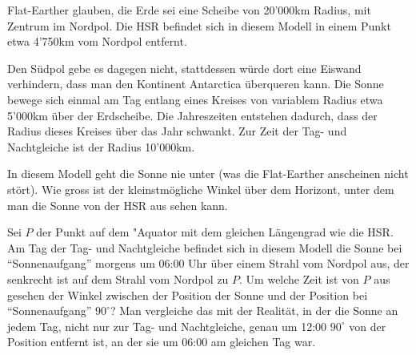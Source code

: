 Flat-Earther glauben, die Erde sei eine Scheibe von 20'000km Radius,
mit Zentrum im Nordpol.
Die HSR befindet sich in diesem Modell in einem Punkt etwa 4'750km
vom Nordpol entfernt.

Den Südpol gebe es dagegen nicht, stattdessen würde dort eine Eiswand
verhindern, dass man den Kontinent Antarctica überqueren kann.
Die Sonne bewege sich einmal am Tag entlang eines Kreises von variablem
Radius etwa 5'000km über der Erdscheibe.
Die Jahreszeiten entstehen dadurch, dass der Radius dieses Kreises
über das Jahr schwankt.
Zur Zeit der Tag- und Nachtgleiche ist der Radius 10'000km.

\begin{teilaufgaben}
\item
In diesem Modell geht die Sonne nie unter (was die Flat-Earther anscheinen
nicht stört).
Wie gross ist der kleinstmögliche Winkel über dem Horizont, unter dem
man die Sonne von der HSR aus sehen kann.
\item
Sei $P$ der Punkt auf dem "Aquator mit dem gleichen Längengrad wie
die HSR.
Am Tag der Tag- und Nachtgleiche befindet sich in diesem Modell
die Sonne bei ``Sonnenaufgang'' morgens um 06:00 Uhr über einem Strahl
vom Nordpol aus, der senkrecht ist auf dem Strahl vom Nordpol zu $P$.
Um welche Zeit ist von $P$ aus gesehen der Winkel zwischen der Position
der Sonne und der Position bei ``Sonnenaufgang'' $90^\circ$?
Man vergleiche das mit der Realität, in der die Sonne an jedem Tag,
nicht nur zur Tag- und Nachtgleiche, genau um 12:00 
$90^\circ$ von der Position entfernt ist, an der sie um 06:00 am
gleichen Tag war.
\end{teilaufgaben}


